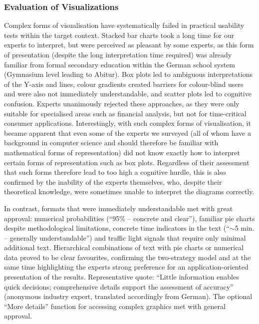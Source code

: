 \documentclass[final,journal,a4paper]{IEEEtran}
\begin{document}
\subsubsection{Evaluation of Visualizations}
Complex forms of visualisation have systematically failed in practical usability tests within the target context. Stacked bar charts took a long time for our experts to interpret, but were perceived as pleasant by some experts, as this form of presentation (despite the long interpretation time required) was already familiar from formal secondary education within the German school system (Gymnasium level leading to Abitur). Box plots led to ambiguous interpretations of the Y-axis and lines, colour gradients created barriers for colour-blind users and were also not immediately understandable, and scatter plots led to cognitive confusion. Experts unanimously rejected these approaches, as they were only suitable for specialised areas such as financial analysis, but not for time-critical consumer applications. Interestingly, with such complex forms of visualisation, it became apparent that even some of the experts we surveyed (all of whom have a background in computer science and should therefore be familiar with mathematical forms of representation) did not know exactly how to interpret certain forms of representation such as box plots. Regardless of their assessment that such forms therefore lead to too high a cognitive hurdle, this is also confirmed by the inability of the experts themselves, who, despite their theoretical knowledge, were sometimes unable to interpret the diagrams correctly.

In contrast, formats that were immediately understandable met with great approval: numerical probabilities (``95\% -- concrete and clear''), familiar pie charts despite methodological limitations, concrete time indicators in the text (``$\sim$5 min. -- generally understandable'') and traffic light signals that require only minimal additional text. Hierarchical combinations of text with pie charts or numerical data proved to be clear favourites, confirming the two-strategy model and at the same time highlighting the experts strong preference for an application-oriented presentation of the results. Representative quote: ``Little information enables quick decisions; comprehensive details support the assessment of accuracy'' (anonymous industry expert, translated accordingly from German). The optional ``More details'' function for accessing complex graphics met with general approval.
\end{document}
